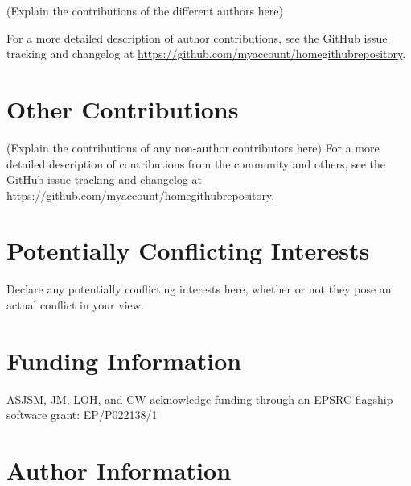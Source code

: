 \documentclass[9pt,tutorial]{livecoms}
\newcommand{\githubrepository}{\url{https://github.com/myaccount/homegithubrepository}}  %
\begin{document}
(Explain the contributions of the different authors here)

For a more detailed description of author contributions,
see the GitHub issue tracking and changelog at \githubrepository.

\section{Other Contributions}
%

(Explain the contributions of any non-author contributors here)
For a more detailed description of contributions from the community and others, see the GitHub issue tracking and changelog at \githubrepository.

\section{Potentially Conflicting Interests}

Declare any potentially conflicting interests here, whether or not they pose an actual conflict in your view.

\section{Funding Information}
ASJSM, JM, LOH, and CW acknowledge funding through an EPSRC flagship software grant: EP/P022138/1

\section*{Author Information}
\makeorcid




\end{document}
